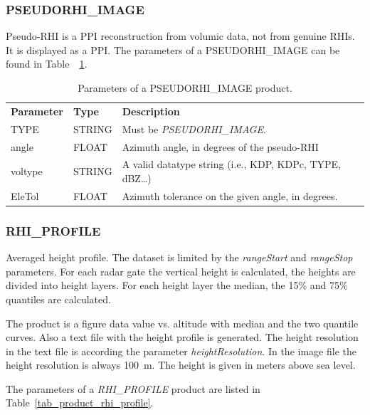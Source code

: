 \documentclass[a4paper,11pt,pdftex,twoside]{scrartcl}
\renewcommand{\bf}{\normalfont \bfseries}
\begin{document}
{{{\subsubsection{PSEUDORHI\_IMAGE}
    \label{subsec_pseudorhi_image}
Pseudo-RHI is a PPI reconstruction from volumic data, not from genuine RHIs. 
It is displayed as a PPI. The parameters of a PSEUDORHI\_IMAGE can be found in Table~~\ref{tab_product_pseudorhi_image}.

\begin{table}[H]
 \begin{tabularx}{\textwidth}{llX}
 \bf{Parameter}  & \bf{Type}  & \bf{Description}\\
 TYPE           & STRING     & Must be \emph{PSEUDORHI\_IMAGE}.\\
 angle          & FLOAT      & Azimuth angle, in degrees of the pseudo-RHI \\
 voltype        & STRING     & A valid datatype string (i.e., KDP, KDPc, TYPE, dBZ\dots)\\
 EleTol         & FLOAT      & Azimuth tolerance on the given angle, in degrees. \\
 \end{tabularx}
 \caption{Parameters of a PSEUDORHI\_IMAGE product.}
 \label{tab_product_pseudorhi_image}
\end{table}



 \subsubsection{RHI\_PROFILE}
 \label{subsec_rhi_profile}

Averaged height profile. The dataset is limited by the  \emph{rangeStart} and
 \emph{rangeStop} parameters. For each radar gate the vertical height is calculated,
 the heights are divided into height layers. For each height layer the median, the
 15\% and 75\% quantiles are calculated.

The product is a figure data value vs. altitude with median  and the two
 quantile curves. Also a text file with the height profile is
 generated. The height resolution in the text file is according the parameter
 \emph{heightResolution}. In the image file the height resolution is always
 100~m. The height is given in meters above sea level.

The parameters of a \emph{RHI\_PROFILE} product are listed in Table~\ref{tab_product_rhi_profile}.

}}}
\end{document}
